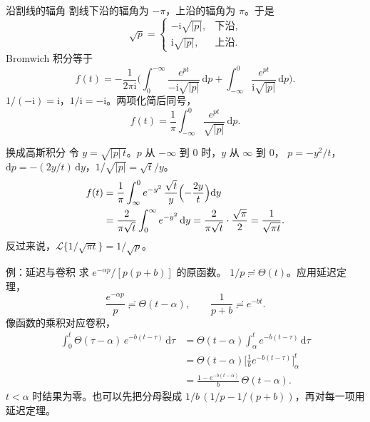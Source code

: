 \documentclass[fontset=windows, chinese, 10pt, xcolor=dvipsnames]{beamer}
\begin{document}
\begin{frame}{沿割线的辐角}
  割线下沿的辐角为 $-\pi$，上沿的辐角为 $\pi$。于是
  \begin{equation*}
    \sqrt{p}=\begin{cases}
      -\mathrm{i}\sqrt{|p|}, & \text{下沿},\\
      \mathrm{i}\sqrt{|p|}, & \text{上沿}.
    \end{cases}
  \end{equation*}
  Bromwich 积分等于
  \begin{equation*}
    f(t)=-\frac{1}{2\pi\mathrm{i}}
      \Biggl(
        \int_0^{-\infty}\frac{e^{pt}}{-\mathrm{i}\sqrt{|p|}}\,\mathrm{d}p
        +\int_{-\infty}^{0}\frac{e^{pt}}{\mathrm{i}\sqrt{|p|}}\,\mathrm{d}p
      \Biggr).
  \end{equation*}
  $1/(-\mathrm{i})=\mathrm{i}$，$1/\mathrm{i}=-\mathrm{i}$。两项化简后同号，
  \begin{equation*}
    f(t)=\frac{1}{\pi}\int_{-\infty}^{0}
      \frac{e^{pt}}{\sqrt{|p|}}\,\mathrm{d}p.
  \end{equation*}
\end{frame}

\begin{frame}{换成高斯积分}
  令 $y=\sqrt{|p|\,t}$。$p$ 从 $-\infty$ 到 $0$ 时，$y$ 从 $\infty$ 到 $0$，
  $p=-y^2/t$，$\mathrm{d}p=-(2y/t)\,\mathrm{d}y$，$1/\sqrt{|p|}=\sqrt{t}/y$。
  \begin{align*}
    f(t)
    &=\frac{1}{\pi}\int_{\infty}^{0}
      e^{-y^2}\,\frac{\sqrt{t}}{y}
      \Bigl(-\frac{2y}{t}\Bigr)\mathrm{d}y \\
    &=\frac{2}{\pi\sqrt{t}}\int_0^{\infty} e^{-y^2}\,\mathrm{d}y
     =\frac{2}{\pi\sqrt{t}}\cdot\frac{\sqrt{\pi}}{2}
     =\frac{1}{\sqrt{\pi t}}.
  \end{align*}
  反过来说，$\mathcal{L}\{1/\sqrt{\pi t}\}=1/\sqrt{p}$。
\end{frame}

\begin{frame}{例：延迟与卷积}
  求 $e^{-\alpha p}/[p(p+b)]$ 的原函数。
  $1/p\risingdotseq\Theta(t)$。应用延迟定理，
  \begin{equation*}
    \frac{e^{-\alpha p}}{p}\risingdotseq\Theta(t-\alpha),
    \qquad
    \frac{1}{p+b}\risingdotseq e^{-bt}.
  \end{equation*}
  像函数的乘积对应卷积，
  \begin{align*}
    \int_0^t\Theta(\tau-\alpha)\,e^{-b(t-\tau)}\,\mathrm{d}\tau
    &=\Theta(t-\alpha)\int_{\alpha}^{t} e^{-b(t-\tau)}\,\mathrm{d}\tau \\
    &=\Theta(t-\alpha)
      \Biggl[\frac{1}{b}e^{-b(t-\tau)}\Biggr]_{\alpha}^{t} \\
    &=\frac{1-e^{-b(t-\alpha)}}{b}\,\Theta(t-\alpha).
  \end{align*}
  $t<\alpha$ 时结果为零。也可以先把分母裂成 $1/b\,(1/p-1/(p+b))$，再对每一项用延迟定理。
\end{frame}
\end{document}

